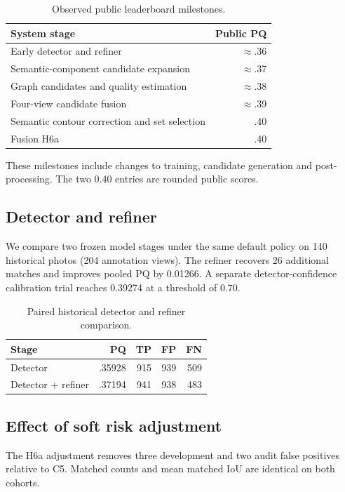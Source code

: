\documentclass[sigconf]{acmart}
\begin{document}
\begin{table}[H]
\caption{Observed public leaderboard milestones.}
\centering
\begin{tabular}{@{}lr@{}}
\toprule
System stage & Public PQ \\
\midrule
Early detector and refiner & $\approx$.36 \\
Semantic-component candidate expansion & $\approx$.37 \\
Graph candidates and quality estimation & $\approx$.38 \\
Four-view candidate fusion & $\approx$.39 \\
Semantic contour correction and set selection & .40 \\
Fusion H6a & .40 \\
\bottomrule
\end{tabular}
\end{table}

These milestones include changes to training, candidate generation and post-processing. The two 0.40 entries are rounded public scores.

\subsection{Detector and refiner}
We compare two frozen model stages under the same default policy on 140 historical photos (204 annotation views). The refiner recovers 26 additional matches and improves pooled PQ by 0.01266. A separate detector-confidence calibration trial reaches 0.39274 at a threshold of 0.70.

\begin{table}[H]
\caption{Paired historical detector and refiner comparison.}
\centering
\begin{tabular}{@{}lrrrr@{}}
\toprule
Stage & PQ & TP & FP & FN\\
\midrule
Detector & .35928 & 915 & 939 & 509\\
Detector + refiner & .37194 & 941 & 938 & 483\\
\bottomrule
\end{tabular}
\end{table}

\subsection{Effect of soft risk adjustment}
The H6a adjustment removes three development and two audit false positives relative to C5. Matched counts and mean matched IoU are identical on both cohorts.
\end{document}
